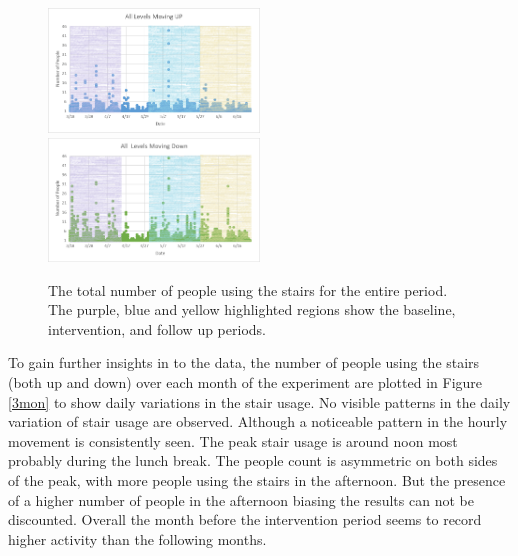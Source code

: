 \begin{figure}[b]
    \includegraphics[width=0.5\textwidth]{image/up.png}%
    \includegraphics[width=0.5\textwidth]{image/down.png}
    \caption{The total number of people using the stairs for the entire period. The purple, blue and yellow highlighted regions show the baseline, intervention, and follow up periods.}
    \label{updown}
\end{figure}


To gain further insights in to the data, the number of people using the stairs (both up and down) over each month of the experiment are plotted in Figure \ref{3mon} to show daily variations in the stair usage. No visible patterns in the daily variation of stair usage are observed.  Although a noticeable pattern in the hourly movement is consistently seen. The peak stair usage is around noon most probably during the lunch break. The people count is asymmetric on both sides of the peak, with more people using the stairs in the afternoon. But the presence of a higher number of people in the afternoon biasing the results can not be discounted. Overall the month before the intervention period seems to record higher activity than the following months.%


